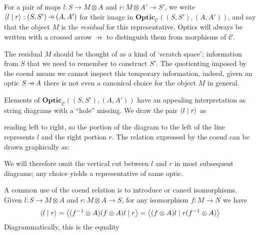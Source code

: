 \documentclass[11pt,letterpaper]{article}
\theoremstyle{plain}
\theoremstyle{definition}
\newcommand{\C}{\mathscr{C}}
\newcommand{\Optic}{\mathbf{Optic}}
\newcommand{\rep}[2]{{\ensuremath \left\langle #1 \mid #2 \right\rangle}}
\newcommand{\hto}{\ensuremath{\,\mathaccent\shortmid\rightarrow\,}}
\begin{document}
For a pair of maps $l : S \to M \otimes A$ and $r : M \otimes A' \to S'$, we write $\rep{l}{r} : (S, S') \hto (A, A')$ for their image in $\Optic_\C((S, S'), (A, A'))$, and say that the object $M$ is the \emph{residual} for this representative. Optics will always be written with a crossed arrow $\hto$ to distinguish them from morphisms of $\C$.

  The residual $M$ should be thought of as a kind of `scratch space'; information from $S$ that we need to remember to construct $S'$. The quotienting imposed by the coend means we cannot inspect this temporary information, indeed, given an optic $S \hto A$ there is not even a canonical choice for the object $M$ in general.
    
  Elements of $\Optic_\C((S, S'), (A, A'))$ have an appealing
  interpretation as string diagrams with a ``hole'' missing. We draw the
  pair $\rep{l}{r}$ as
  \begin{center}
    
  \end{center}
  reading left to right, so the portion of the diagram to the left of the line represents $l$ and the right portion $r$. The relation expressed by the coend can be drawn graphically as:
  \begin{center}
    
    \hspace{0.7cm} \raisebox{1.35cm}{$\sim$} \hspace{1cm}
    
  \end{center}
  We will therefore omit the vertical cut between $l$ and $r$ in most subsequent diagrams; any choice yields a representative of same optic.

A common use of the coend relation is to introduce or cancel isomorphisms. Given $l : S \to M \otimes A$ and $r : M \otimes A \to S$, for any isomorphism $f : M \to N$ we have
\begin{align*}
\rep{l}{r} = \rep{(f^{-1} \otimes A)(f \otimes A)l}{r} = \rep{(f \otimes A)l}{r(f^{-1} \otimes A)}
\end{align*}
Diagrammatically, this is the equality
  \begin{center}
    
    \hspace{0.8cm} \raisebox{1.5cm}{$=$} \hspace{1cm}
    
  \end{center}
  
\end{document}
